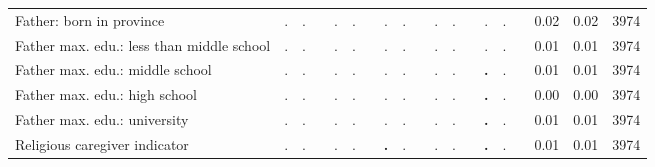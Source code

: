 \begin{tabular}{l c c c c c c c c c c c c c c c c c c}
Father: born in province &         . &         . & &         . &         . & &         . &         . & &         . &         . & &         . &         . & &      0.02 &      0.02 &      3974 \\
Father max. edu.: less than middle school &         . &         . & &         . &         . & &         . &         . & &         . &         . & &         . &         . & &      0.01 &      0.01 &      3974 \\
Father max. edu.: middle school &         . &         . & &         . &         . & &         . &         . & &         . &         . & & \textbf{        .} &         . & &      0.01 &      0.01 &      3974 \\
Father max. edu.: high school &         . &         . & &         . &         . & &         . &         . & &         . &         . & & \textbf{        .} &         . & &      0.00 &      0.00 &      3974 \\
Father max. edu.: university &         . &         . & &         . &         . & &         . &         . & &         . &         . & & \textbf{        .} &         . & &      0.01 &      0.01 &      3974 \\
Religious caregiver indicator &         . &         . & &         . &         . & & \textbf{        .} &         . & &         . &         . & & \textbf{        .} &         . & &      0.01 &      0.01 &      3974 \\
\bottomrule
\end{tabular}
